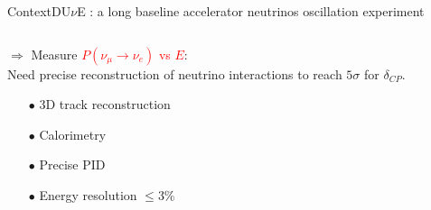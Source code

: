 \documentclass[10pt]{beamer}
\begin{document}
\begin{frame}{Context}{DU$\nu$E : a long baseline accelerator neutrinos oscillation experiment}
\begin{columns}
\begin{column}{0.4\textwidth}
\begin{itemize}
	    		\end{itemize}
    			\begin{scriptsize}
	    			$\Rightarrow$ Measure \textcolor{red}{$P(\nu_{\mu}\to\nu_e)$ vs $E$}: \\
	    			Need precise reconstruction of neutrino interactions to reach $5\sigma$ for $\delta_{CP}$.
    			\end{scriptsize}
    			\begin{itemize}
    				\item[$\bullet$] 3D track reconstruction
    				\item[$\bullet$] Calorimetry
    				\item[$\bullet$] Precise PID
    				\item[$\bullet$] Energy resolution $\leq$3\%
    			\end{itemize}
    		\end{column}
    	\end{columns}
    \end{frame}
    
\end{document}
